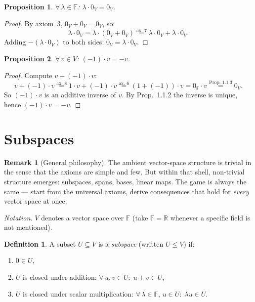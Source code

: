 \documentclass[11pt]{article}
\theoremstyle{definition}
\newtheorem{definition}{Definition}[section]
\newtheorem{remark}{Remark}[section]
\theoremstyle{plain}
\newtheorem{proposition}{Proposition}[section]
\begin{document}
\begin{proposition}
  $\forall\, \lambda\in\mathbb{F}$:\; $\lambda\cdot 0_V = 0_V$.
\end{proposition}
\begin{proof}
  By axiom~3, $0_V + 0_V = 0_V$, so:
  \[
    \lambda\cdot 0_V
    = \lambda\cdot(0_V + 0_V)
    \stackrel{\text{ax.~7}}{=} \lambda\cdot 0_V + \lambda\cdot 0_V.
  \]
  Adding $-(\lambda\cdot 0_V)$ to both sides: $0_V = \lambda\cdot 0_V$.
\end{proof}

\begin{proposition}
  $\forall\, v\in V$:\; $(-1)\cdot v = -v$.
\end{proposition}
\begin{proof}
  Compute $v + (-1)\cdot v$:
  \[
    v + (-1)\cdot v
    \stackrel{\text{ax.~8}}{=} 1\cdot v + (-1)\cdot v
    \stackrel{\text{ax.~6}}{=} (1 + (-1))\cdot v
    = 0_{\mathbb{F}}\cdot v
    \stackrel{\text{Prop.~1.1.3}}{=} 0_V.
  \]
  So $(-1)\cdot v$ is an additive inverse of $v$.  By Prop.~1.1.2 the
  inverse is unique, hence $(-1)\cdot v = -v$.
\end{proof}

\section{Subspaces}

\begin{remark}[General philosophy]
  The ambient vector-space structure is trivial in the sense that the
  axioms are simple and few.  But within that shell, non-trivial structure
  emerges: subspaces, spans, bases, linear maps.  The game is always the
  same --- start from the universal axioms, derive consequences that hold
  for \emph{every} vector space at once.
\end{remark}

\noindent\textit{Notation.} $V$ denotes a vector space over $\mathbb{F}$
(take $\mathbb{F}=\mathbb{R}$ whenever a specific field is not mentioned).

\begin{definition}
  A subset $U\subseteq V$ is a \emph{subspace} (written $U\le V$) if:
  \begin{enumerate}
    \item $0\in U$,
    \item $U$ is closed under addition:
          $\forall\, u,v\in U:\; u+v\in U$,
    \item $U$ is closed under scalar multiplication:
          $\forall\, \lambda\in\mathbb{F},\, u\in U:\; \lambda u\in U$.
  \end{enumerate}
\end{definition}
\end{document}
